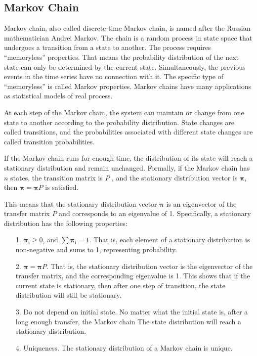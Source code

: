 \documentclass[lettersize,journal,12pt]{IEEEtran}
\begin{document}
\subsection{Markov Chain}

Markov chain, also called discrete-time Markov chain, is named after the Russian mathematician Andrei Markov. The chain is a random process in state space that undergoes a transition from a state to another. The process requires ``memoryless'' properties. That means the probability distribution of the next state can only be determined by the current state. Simultaneously, the previous events in the time series have no connection with it. The specific type of ``memoryless'' is called Markov properties. Markov chains have many applications as statistical models of real process.

At each step of the Markov chain, the system can maintain or change from one state to another according to the probability distribution. State changes are called transitions, and the probabilities associated with different state changes are called transition probabilities.

If the Markov chain runs for enough time, the distribution of its state will reach a stationary distribution and remain unchanged. Formally, if the Markov chain has $n$ states, the transition matrix is $P$
, and the stationary distribution vector is $\boldsymbol{\pi}$, then $\boldsymbol{\pi} = \boldsymbol{\pi} P$ is satisfied.

This means that the stationary distribution vector $\boldsymbol{\pi}$ is an eigenvector of the transfer matrix $P$ and corresponds to an eigenvalue of 1. Specifically, a stationary distribution has the following properties:
\begin{enumerate}
	\item [1.] $\boldsymbol{\pi_i}\geq0$, and $\sum\boldsymbol{\pi_i}=1$. That is, each element of a stationary distribution is non-negative and sums to 1, representing probability.
	\item [2.] $\boldsymbol{\pi} = \boldsymbol{\pi} P$. That is, the stationary distribution vector is the eigenvector of the transfer matrix, and the corresponding eigenvalue is 1. This shows that if the current state is stationary, then after one step of transition, the state distribution will still be stationary.
	\item [3.] Do not depend on initial state. No matter what the initial state is, after a long enough transfer, the Markov chain
	      The state distribution will reach a stationary distribution.
	\item [4.] Uniqueness. The stationary distribution of a Markov chain is unique.
\end{enumerate}
\end{document}
